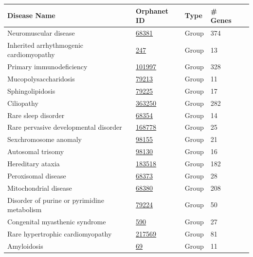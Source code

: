 \begin{table}[ht]
\centering
\footnotesize
\begin{tabular}{l l l l c}
\hline
\textbf{Disease Name} & \textbf{Orphanet ID} & \textbf{Type} & \textbf{\# Genes} \\
\hline
Neuromuscular disease & \href{https://www.orpha.net/en/disease/detail/68381}{68381} & Group & 374 \\
Inherited arrhythmogenic cardiomyopathy & \href{https://www.orpha.net/en/disease/detail/247}{247} & Group & 13 \\
Primary immunodeficiency & \href{https://www.orpha.net/en/disease/detail/101997}{101997} & Group & 328 \\
Mucopolysaccharidosis & \href{https://www.orpha.net/en/disease/detail/79213}{79213} & Group & 11 \\
Sphingolipidosis & \href{https://www.orpha.net/en/disease/detail/79225}{79225} & Group & 17 \\
Ciliopathy & \href{https://www.orpha.net/en/disease/detail/363250}{363250} & Group & 282 \\
Rare sleep disorder & \href{https://www.orpha.net/en/disease/detail/68354}{68354} & Group & 14 \\
Rare pervasive developmental disorder & \href{https://www.orpha.net/en/disease/detail/168778}{168778} & Group & 25 \\
Sexchromosome anomaly & \href{https://www.orpha.net/en/disease/detail/98155}{98155} & Group & 21 \\
Autosomal trisomy & \href{https://www.orpha.net/en/disease/detail/98130}{98130} & Group & 16 \\
Hereditary ataxia & \href{https://www.orpha.net/en/disease/detail/183518}{183518} & Group & 182 \\
Peroxisomal disease & \href{https://www.orpha.net/en/disease/detail/68373}{68373} & Group & 28 \\
Mitochondrial disease & \href{https://www.orpha.net/en/disease/detail/68380}{68380} & Group & 208 \\
Disorder of purine or pyrimidine metabolism & \href{https://www.orpha.net/en/disease/detail/79224}{79224} & Group & 50 \\
Congenital myasthenic syndrome & \href{https://www.orpha.net/en/disease/detail/590}{590} & Group & 27 \\
Rare hypertrophic cardiomyopathy & \href{https://www.orpha.net/en/disease/detail/217569}{217569} & Group & 81 \\
Amyloidosis &\href{https://www.orpha.net/en/disease/detail/69}{69} & Group & 11 \\

\end{tabular}
\end{table}
